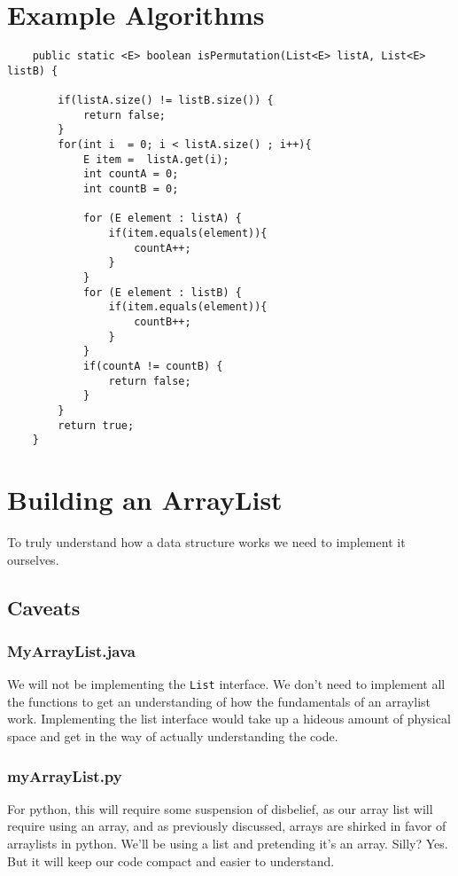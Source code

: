 \section{Example Algorithms}


\begin{verbatim}
	public static <E> boolean isPermutation(List<E> listA, List<E> listB) {
		
		if(listA.size() != listB.size()) {
			return false;
		}
		for(int i  = 0; i < listA.size() ; i++){
			E item =  listA.get(i);
			int countA = 0;
			int countB = 0;
			
			for (E element : listA) {
				if(item.equals(element)){
					countA++;
				}
			}
			for (E element : listB) {
				if(item.equals(element)){
					countB++;
				}
			}
			if(countA != countB) {
				return false;
			}
		}
		return true;
	}
\end{verbatim}



\section{Building an ArrayList}
\label{buildingArraylist}
To truly understand how a data structure works we need to implement it ourselves.

\subsection{Caveats}

\subsubsection{MyArrayList.java}
We will not be implementing the \texttt{List} interface. We don't need to implement all the functions to get an understanding of how the fundamentals of an arraylist work.
Implementing the list interface would take up a hideous amount of physical space and get in the way of actually understanding the code.



\subsubsection{myArrayList.py}

For python, this will require some suspension of disbelief, as our array list will require using an array, and as previously discussed, arrays are shirked in favor of arraylists in python.  We'll be using a list and pretending it's an array. Silly?  Yes.  But it will keep our code compact and easier to understand.

